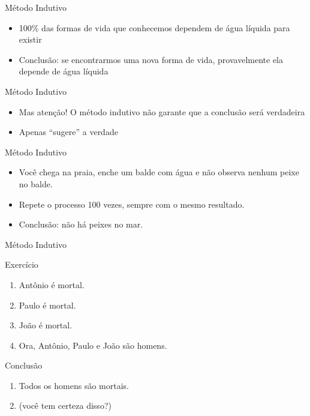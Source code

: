 \documentclass{beamer}
\begin{document}
\begin{frame}{Método Indutivo}
  \begin{example}
    \begin{itemize}
    \item 100\% das formas de vida que conhecemos dependem de água
      líquida para existir
    \item Conclusão: se encontrarmos uma nova forma de vida,
      \alert{provavelmente} ela depende de água líquida
    \end{itemize}
  \end{example}
\end{frame}

\begin{frame}{Método Indutivo}
  \begin{itemize}
  \item Mas atenção! O método indutivo não garante que a conclusão
    será verdadeira
  \item Apenas ``sugere'' a verdade
  \end{itemize}
\end{frame}

\begin{frame}{Método Indutivo}
  \begin{example}
    \begin{itemize}
    \item Você chega na praia, enche um balde com água e não observa
      nenhum peixe no balde.
    \item Repete o processo 100 vezes, sempre com o mesmo resultado.
    \item Conclusão: não há peixes no mar.
    \end{itemize}
  \end{example}
\end{frame}

\begin{frame}{Método Indutivo}
  \begin{block}{Exercício}
    \begin{enumerate}
    \item Antônio é mortal.
    \item Paulo é mortal.
    \item João é mortal.
    \item Ora, Antônio, Paulo e João são homens.
    \end{enumerate}
  \end{block}
  \begin{block}{Conclusão}
    \begin{enumerate}
    \item Todos os homens são mortais.
    \item (você tem certeza disso?)
    \end{enumerate}
  \end{block}
\end{frame}
\end{document}
